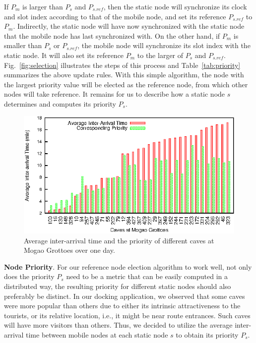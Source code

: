 \documentclass[twoside,twocolumn]{article}
\begin{document}
If $P_m$ is larger than $P_s$ and $P_{s.ref}$, then the static node
will synchronize its clock and slot index according to that of the
mobile node, and set its reference $P_{s.ref}$ to $P_m$. Indirectly,
the static node will have now synchronized with the static node that
the mobile node has last synchronized with. On the other hand, if
$P_m$ is smaller than $P_s$ or $P_{s.ref}$, the mobile node will
synchronize its slot index with the static node.  It will also
set its reference $P_m$ to the larger of $P_s$ and $P_{s.ref}$.
Fig.~\ref{fig:selection} illustrates the steps of this process and
Table~\ref{tab:priority} summarizes the above update rules. With this
simple algorithm, the node with the largest priority value will be
elected as the reference node, from which other nodes will take
reference.  It remains for us to describe how a static node $s$
determines and computes its priority $P_s$.

\begin{figure}[t]
   \centering
   \includegraphics[scale=0.85]{graphs/visiting_frequency/visitingfrequency}
   \caption{Average inter-arrival time and the priority of different
            caves at Mogao Grottoes over one day.}
   \label{fig:visitingfrequency}
\end{figure}

{\bf Node Priority}. For our reference node election algorithm to work
well, not only does the priority $P_s$ need to be a metric that can be
easily computed in a distributed way, the resulting priority for
different static nodes should also preferably be distinct. In our
docking application, we observed that some caves were more popular
than others due to either its intrinsic attractiveness to the
tourists, or its relative location, i.e., it might be near route
entrances. Such caves will have more visitors than others. Thus, we
decided to utilize the average inter-arrival time between mobile nodes
at each static node $s$ to obtain its priority $P_s$.
\end{document}

